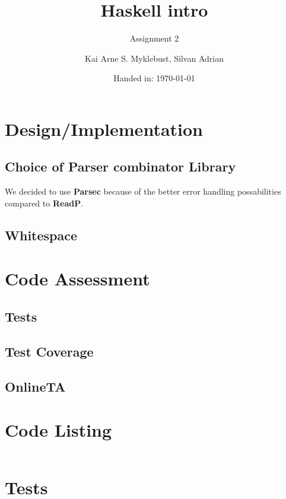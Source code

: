 \documentclass[12pt,a4paper]{article}
\begin{document}
\title{Haskell intro}
\subtitle{Assignment 2}

\author{Kai Arne S. Myklebust, Silvan Adrian}
\date{Handed in: \today}
	
\maketitle
\tableofcontents

\section{Design/Implementation}


\subsection{Choice of Parser combinator Library}
We decided to use \textbf{Parsec} because of the better error handling possabilities compared to \textbf{ReadP}.


\subsection{Whitespace}

\subsection{}

\section{Code Assessment}

\subsection{Tests}


\subsection{Test Coverage}

\subsection{OnlineTA}



\appendix
\section{Code Listing}

\inputminted{haskell}{handout/src/Parser/Impl.hs}

\section{Tests}

\inputminted{haskell}{handout/tests/Test.hs}
\end{document}
